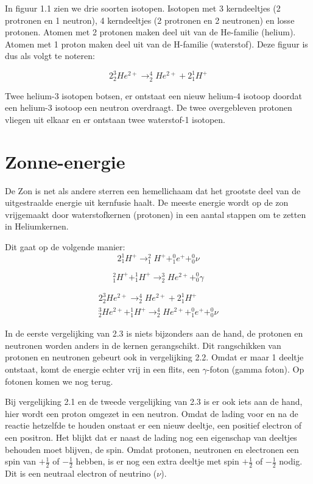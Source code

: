 In figuur 1.1 zien we drie soorten isotopen. Isotopen met 3 kerndeeltjes
(2 protronen en 1 neutron), 4 kerndeeltjes (2 protronen en 2 neutronen)
en losse protonen. Atomen met 2 protonen maken deel uit van de He-familie
(helium). Atomen met 1 proton maken deel uit van de H-familie (waterstof).
Deze figuur is dus als volgt te noteren:

\[
2_{2}^{3}He^{2+}\rightarrow_{2}^{4}He^{2+}+2_{1}^{1}H^{+}
\]


Twee helium-3 isotopen botsen, er ontstaat een nieuw helium-4 isotoop
doordat een helium-3 isotoop een neutron overdraagt. De twee overgebleven
protonen vliegen uit elkaar en er ontstaan twee waterstof-1 isotopen.


\section{Zonne-energie}

De Zon is net als andere sterren een hemellichaam dat het grootste
deel van de uitgestraalde energie uit kernfusie haalt. De meeste energie
wordt op de zon vrijgemaakt door waterstofkernen (protonen) in een
aantal stappen om te zetten in Heliumkernen. 

\newpage{}Dit gaat op de volgende manier:
\begin{equation}
2_{1}^{1}H^{+}\rightarrow_{1}^{2}H^{+}+_{1}^{0}e^{+}+_{0}^{0}\nu
\end{equation}


\begin{equation}
_{1}^{2}H^{+}+_{1}^{1}H^{+}\rightarrow_{2}^{3}He^{2+}+_{0}^{0}\gamma
\end{equation}


\begin{equation}
\begin{array}{c}
2_{2}^{3}He^{2+}\rightarrow_{2}^{4}He^{2+}+2_{1}^{1}H^{+}\\
_{2}^{3}He^{2+}+_{1}^{1}H^{+}\rightarrow_{2}^{4}He^{2+}+_{1}^{0}e^{+}+_{0}^{0}\nu
\end{array}
\end{equation}
 

In de eerste vergelijking van 2.3 is niets bijzonders aan de hand,
de protonen en neutronen worden anders in de kernen gerangschikt.
Dit rangschikken van protonen en neutronen gebeurt ook in vergelijking
2.2. Omdat er maar 1 deeltje ontstaat, komt de energie echter vrij
in een flits, een $\gamma$-foton (gamma foton). Op fotonen komen
we nog terug.

Bij vergelijking 2.1 en de tweede vergelijking van 2.3 is er ook iets
aan de hand, hier wordt een proton omgezet in een neutron. Omdat de
lading voor en na de reactie hetzelfde te houden onstaat er een nieuw
deeltje, een positief electron of een positron. Het blijkt dat er
naast de lading nog een eigenschap van deeltjes behouden moet blijven,
de spin. Omdat protonen, neutronen en electronen een spin van $+\frac{1}{2}$
of $-\frac{1}{2}$ hebben, is er nog een extra deeltje met spin $+\frac{1}{2}$
of $-\frac{1}{2}$ nodig. Dit is een neutraal electron of neutrino
($\nu$).

